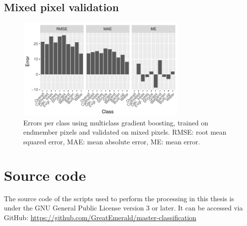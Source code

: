 \documentclass[a4paper,12pt]{scrbook}
\begin{document}
\begin{appendices}
 \section{Mixed pixel validation}
 \begin{figure}[!h]
  \centering
  \includegraphics[width=0.75\textwidth]{thesis-figures/perclass-errors-gb}
  \caption{Errors per class using multiclass gradient boosting, trained on endmember pixels and validated on mixed pixels. RMSE: root mean squared error, MAE: mean absolute error, ME: mean error.}
  \label{fig-perclass-errors-gb}
 \end{figure}
 
 \chapter{Source code}
 The source code of the scripts used to perform the processing in this thesis is under the GNU General Public License version 3 or later. It can be accessed via GitHub: \url{https://github.com/GreatEmerald/master-classification}
 
\end{appendices}
\end{document}
